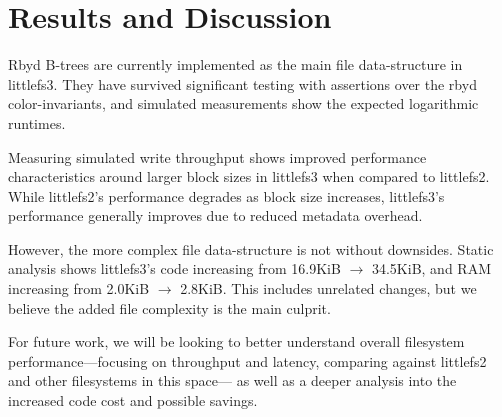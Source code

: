 \documentclass[letterpaper,twocolumn,10pt]{article}
\def\lfs+{littlefs}
\def\lfsiii+{avianfs}
\def\lfsiii+{littlefs3}
\def\lfsii+{littlefs2}
\begin{document}
\section{Results and Discussion}
\label{sec:results}
\label{sec:discussion}

Rbyd B-trees are currently implemented as
the main file data-structure in
\lfsiii+. They have survived significant testing %
with assertions
over the rbyd color-invariants, and simulated measurements show the
expected logarithmic runtimes.

Measuring simulated
write throughput shows improved performance
characteristics around larger block sizes in \lfsiii+ when compared to
\lfsii+.
While \lfsii+'s performance degrades as block size increases, \lfsiii+'s
performance
generally improves due to reduced metadata overhead.

However, the more complex file data-structure is not without downsides.
Static analysis shows \lfsiii+'s code increasing from
16.9KiB {$\rightarrow$} 34.5KiB, and RAM increasing from
2.0KiB {$\rightarrow$} 2.8KiB. %
This includes unrelated changes, but we believe the added file
complexity is the main culprit.

For future work, we will be looking to better understand overall
filesystem performance---focusing on throughput and latency, comparing 
against \lfsii+ and other filesystems in this space---%
as well as a deeper analysis into the increased code cost and possible
savings.



% 
% 
% 
% 
% 
% 
% 
% 
% 
% 
% 
% 
% 
% 
% 
\end{document}

